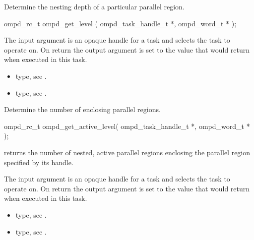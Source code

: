 \label{ompd:ompd_get_level}
\summary
Determine the nesting depth of a particular parallel region.

\format
\cspecificstart
\begin{boxedcode}
ompd\_rc\_t ompd\_get\_level (
  ompd\_task\_handle\_t *, 
  ompd\_word\_t * 
); 
\end{boxedcode}
\cspecificend

\descr

\argdesc
The input argument  is an opaque handle for a task and selects the task to operate on.
On return the output argument  is set to the value that  would return 
when executed in this task.


\crossreferences
\begin{itemize}
	\item {} type, see .
	\item {} type, see .
\end{itemize}


\label{ompd:ompd_get_active_level}
\summary
Determine the number of enclosing  parallel regions.

\format
\cspecificstart
\begin{boxedcode}
ompd\_rc\_t ompd\_get\_active\_level(
  ompd\_task\_handle\_t *, 
  ompd\_word\_t *
); 
\end{boxedcode}
\cspecificend

\descr
{} returns the number of nested, active
parallel regions enclosing the parallel region specified by its handle.

\argdesc
The input argument  is an opaque handle for a task and selects the task to operate on.
On return the output argument  is set to the value that  would return when
executed in this task.

\crossreferences
\begin{itemize}
	\item {} type, see .
	\item {} type, see .
\end{itemize}

